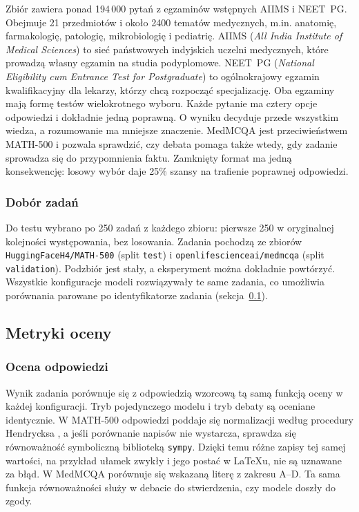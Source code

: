 Zbiór \cite{pmlr-v174-pal22a} zawiera ponad 194\,000 pytań z egzaminów wstępnych AIIMS i NEET~PG. Obejmuje 21 przedmiotów i około 2400 tematów medycznych, m.in. anatomię, farmakologię, patologię, mikrobiologię i pediatrię. AIIMS (\textit{All India Institute of Medical Sciences}) to sieć państwowych indyjskich uczelni medycznych, które prowadzą własny egzamin na studia podyplomowe. NEET~PG (\textit{National Eligibility cum Entrance Test for Postgraduate}) to ogólnokrajowy egzamin kwalifikacyjny dla lekarzy, którzy chcą rozpocząć specjalizację. Oba egzaminy mają formę testów wielokrotnego wyboru. Każde pytanie ma cztery opcje odpowiedzi i dokładnie jedną poprawną. O wyniku decyduje przede wszystkim wiedza, a rozumowanie ma mniejsze znaczenie. MedMCQA jest przeciwieństwem MATH-500 i pozwala sprawdzić, czy debata pomaga także wtedy, gdy zadanie sprowadza się do przypomnienia faktu. Zamknięty format ma jedną konsekwencję: losowy wybór daje 25\% szansy na trafienie poprawnej odpowiedzi.

\subsubsection{Dobór zadań}

Do testu wybrano po 250 zadań z każdego zbioru: pierwsze 250 w oryginalnej kolejności występowania, bez losowania. Zadania pochodzą ze zbiorów \texttt{HuggingFaceH4/MATH-500} (split \texttt{test}) i \texttt{openlifescienceai/medmcqa} (split \texttt{validation}). Podzbiór jest stały, a eksperyment można dokładnie powtórzyć. Wszystkie konfiguracje modeli rozwiązywały te same zadania, co umożliwia porównania parowane po identyfikatorze zadania (sekcja~\ref{sec:metryki}).

\subsection{Metryki oceny}
\label{sec:metryki}

\subsubsection{Ocena odpowiedzi}

Wynik zadania porównuje się z odpowiedzią wzorcową tą samą funkcją oceny w każdej konfiguracji. Tryb pojedynczego modelu i tryb debaty są oceniane identycznie. W MATH-500 odpowiedzi poddaje się normalizacji według procedury Hendrycksa \cite{hendrycksmath2021}, a jeśli porównanie napisów nie wystarcza, sprawdza się równoważność symboliczną biblioteką \texttt{sympy}. Dzięki temu różne zapisy tej samej wartości, na przykład ułamek zwykły i jego postać w \LaTeX{}u, nie są uznawane za błąd. W MedMCQA porównuje się wskazaną literę z zakresu A--D. Ta sama funkcja równoważności służy w debacie do stwierdzenia, czy modele doszły do zgody.


